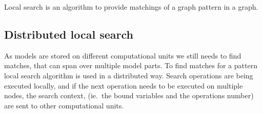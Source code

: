 Local search is an algorithm to provide matchings of a graph pattern in a graph.

\subsection{Distributed local search}

As models are stored on different computational units we still needs to find matches, that can span over multiple model parts. To find matches for a pattern local search algorithm is used in a distributed way. Search operations are being executed locally, and if the next operation needs to be executed on multiple nodes, the search context, (ie.\ the bound variables and the operations number) are sent to other computational units.
